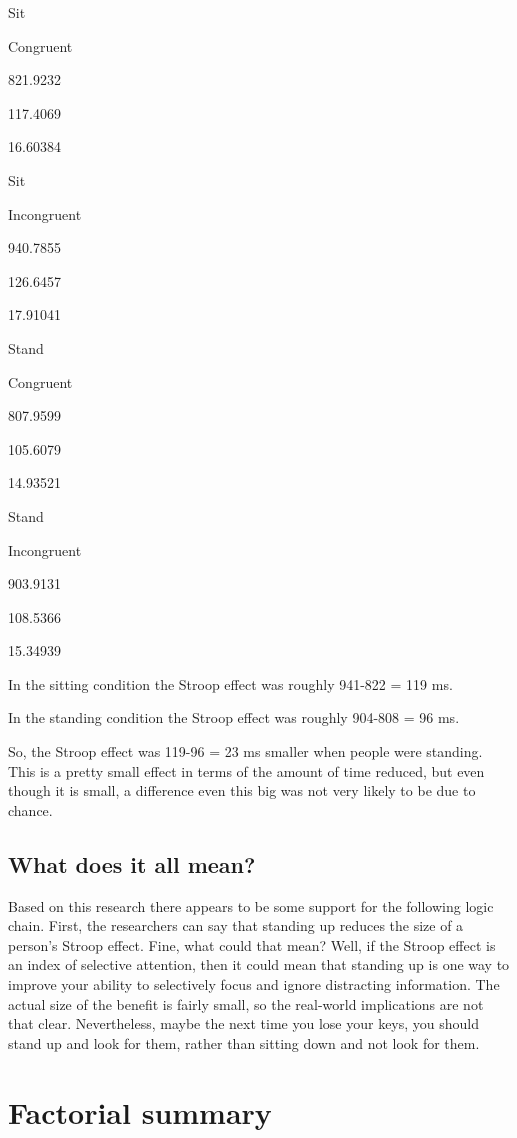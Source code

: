 \documentclass[
]{book}
\begin{document}
Sit

Congruent

821.9232

117.4069

16.60384

Sit

Incongruent

940.7855

126.6457

17.91041

Stand

Congruent

807.9599

105.6079

14.93521

Stand

Incongruent

903.9131

108.5366

15.34939

In the sitting condition the Stroop effect was roughly 941-822 = 119 ms.

In the standing condition the Stroop effect was roughly 904-808 = 96 ms.

So, the Stroop effect was 119-96 = 23 ms smaller when people were standing. This is a pretty small effect in terms of the amount of time reduced, but even though it is small, a difference even this big was not very likely to be due to chance.

\hypertarget{what-does-it-all-mean}{%
\subsection{What does it all mean?}\label{what-does-it-all-mean}}

Based on this research there appears to be some support for the following logic chain. First, the researchers can say that standing up reduces the size of a person's Stroop effect. Fine, what could that mean? Well, if the Stroop effect is an index of selective attention, then it could mean that standing up is one way to improve your ability to selectively focus and ignore distracting information. The actual size of the benefit is fairly small, so the real-world implications are not that clear. Nevertheless, maybe the next time you lose your keys, you should stand up and look for them, rather than sitting down and not look for them.

\hypertarget{factorial-summary}{%
\section{Factorial summary}\label{factorial-summary}}
\end{document}
